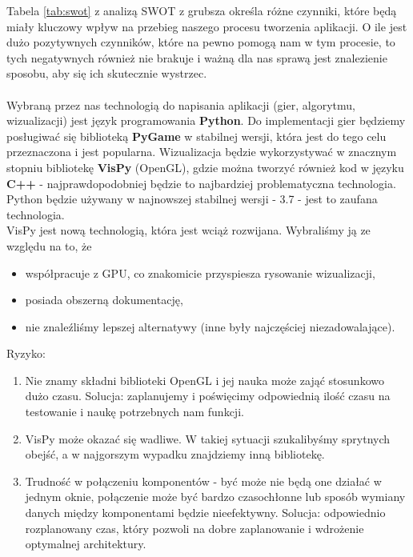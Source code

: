 \documentclass{article}
\begin{document}
	\noindent Tabela \ref{tab:swot} z analizą SWOT z grubsza określa różne czynniki, które będą miały kluczowy wpływ na przebieg naszego procesu tworzenia aplikacji. O ile jest dużo pozytywnych czynników, które na pewno pomogą nam w tym procesie, to tych negatywnych również nie brakuje i ważną dla nas sprawą jest znalezienie sposobu, aby się ich skutecznie wystrzec.\\\\
	Wybraną przez nas technologią do napisania aplikacji (gier, algorytmu, wizualizacji) jest język programowania \textbf{Python}. Do implementacji gier będziemy posługiwać się biblioteką \textbf{PyGame} w stabilnej wersji, która jest do tego celu przeznaczona i jest popularna. Wizualizacja będzie wykorzystywać w znacznym stopniu bibliotekę \textbf{VisPy} (OpenGL), gdzie można tworzyć również kod w języku \textbf{C++} - najprawdopodobniej będzie to najbardziej problematyczna technologia.
	Python będzie używany w najnowszej stabilnej wersji - 3.7 - jest to zaufana technologia.\\
	
	\noindent VisPy jest nową technologią, która jest wciąż rozwijana. Wybraliśmy ją ze względu na to, że
	\begin{itemize}
		\item współpracuje z GPU, co znakomicie przyspiesza rysowanie wizualizacji,
		\item posiada obszerną dokumentację,
		\item nie znaleźliśmy lepszej alternatywy (inne były najczęściej niezadowalające).\\
	\end{itemize}
	Ryzyko:
	\begin{enumerate}
		\item Nie znamy składni biblioteki OpenGL i jej nauka może zająć stosunkowo dużo czasu. Solucja: zaplanujemy i poświęcimy odpowiednią ilość czasu na testowanie i naukę potrzebnych nam funkcji.
		\item VisPy może okazać się wadliwe. W takiej sytuacji szukalibyśmy sprytnych obejść, a w najgorszym wypadku znajdziemy inną bibliotekę.
		\item Trudność w połączeniu komponentów - być może nie będą one działać w jednym oknie, połączenie może być bardzo czasochłonne lub sposób wymiany danych między komponentami będzie nieefektywny. Solucja: odpowiednio rozplanowany czas, który pozwoli na dobre zaplanowanie i wdrożenie optymalnej architektury. 
	\end{enumerate}
\end{document}
